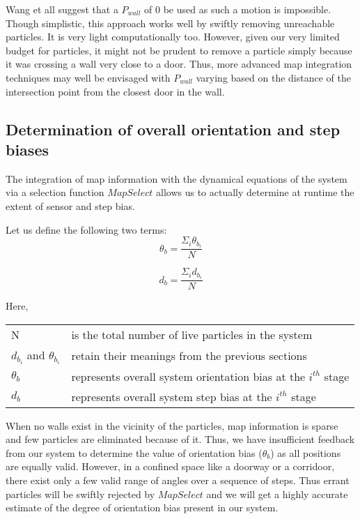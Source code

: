 Wang et all suggest that a $P_{wall}$ of 0 be used as such a motion is impossible.
Though simplistic, this approach works well by swiftly removing unreachable 
particles. It is very light computationally too. 
However, given our very limited budget for particles, it might not be prudent 
to remove a particle simply because it was crossing a wall very close to a 
door. Thus, more advanced map integration techniques may well be 
envisaged with $P_{wall}$ varying based on the distance of the intersection
point from the closest door in the wall. 

\subsection{Determination of overall orientation and step biases}

The integration of map information with the dynamical equations of the system 
via a selection function $MapSelect$ allows us to actually determine 
at runtime the extent of sensor and step bias. 

Let us define the following two terms:
\begin{equation}
\theta_b = \frac{\Sigma_{i} \theta_{b_i}}{N}
\end{equation}

\begin{equation}
d_b = \frac{\Sigma_{i} d_{b_i}}{N}
\end{equation}

Here,\\
\begin{tabular}{p{1.5in} p{3.5in}}
N & is the total number of live particles in the system \\
$d_{b_i}$ and $\theta_{b_i}$ & retain their meanings from the previous sections \\
$\theta_b$ & represents overall system orientation bias at the $i^{th}$ stage \\
$d_b$ & represents overall system step bias at the $i^{th}$ stage \\
\end{tabular}

When no walls exist in the vicinity of the particles, map information is sparse
and few particles are eliminated because of it. Thus, we have insufficient 
feedback from our system to determine the value of orientation bias ($\theta_b$)
as all positions are equally valid. However, in a confined space like a 
doorway or a corridoor, there exist only a few valid range of angles over 
a sequence of steps. Thus
errant particles will be swiftly rejected by $MapSelect$ and we will 
get a highly accurate estimate of the degree of orientation bias present 
in our system.

